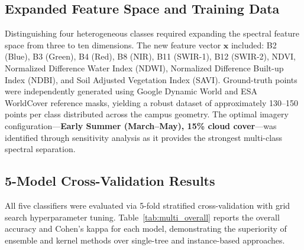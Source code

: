 \documentclass[12pt, a4paper, twocolumn]{article}
\begin{document}
\subsection{Expanded Feature Space and Training Data}
Distinguishing four heterogeneous classes required expanding the spectral feature space from three to ten dimensions.
The new feature vector $\mathbf{x}$ included: B2 (Blue), B3 (Green), B4 (Red), B8 (NIR), B11 (SWIR-1), B12 (SWIR-2), NDVI, Normalized Difference Water Index (NDWI), Normalized Difference Built-up Index (NDBI), and Soil Adjusted Vegetation Index (SAVI).
Ground-truth points were independently generated using Google Dynamic World and ESA WorldCover reference masks, yielding a robust dataset of approximately 130--150 points per class distributed across the campus geometry.
The optimal imagery configuration---\textbf{Early Summer (March--May), 15\% cloud cover}---was identified through sensitivity analysis as it provides the strongest multi-class spectral separation.

\subsection{5-Model Cross-Validation Results}

All five classifiers were evaluated via 5-fold stratified cross-validation with grid search hyperparameter tuning.
Table~\ref{tab:multi_overall} reports the overall accuracy and Cohen's kappa for each model, demonstrating the superiority of ensemble and kernel methods over single-tree and instance-based approaches.

\begin{table}[H]
\centering
\caption{Multi-class 5-fold CV results -- all 5 classifiers (campus dataset).}
\label{tab:multi_overall}
\end{table}
\end{document}
